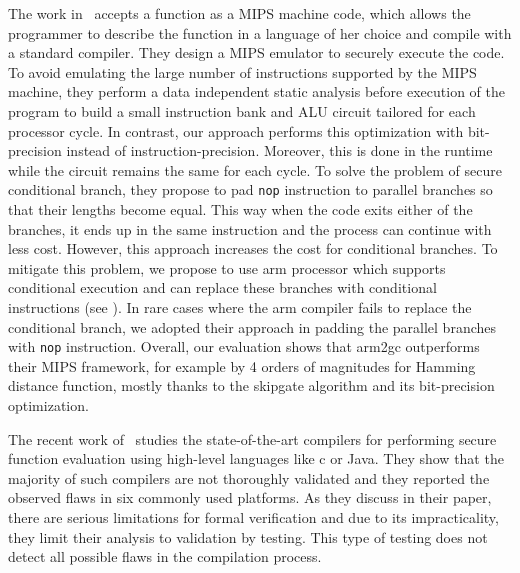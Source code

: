 The work in~\cite{wang2016secure} accepts a function as a MIPS machine code, which allows the programmer to describe the function in a language of her choice and compile with a standard compiler.
They design a MIPS emulator to securely execute the code.
To avoid emulating the large number of instructions supported by the MIPS machine, they perform a data independent static analysis before execution of the program to build a small instruction bank and ALU circuit tailored for each processor cycle.
In contrast, our approach performs this optimization with bit-precision instead of instruction-precision.
Moreover, this is done in the runtime while the circuit remains the same for each cycle.
To solve the problem of secure conditional branch, they propose to pad \texttt{nop} instruction to parallel branches so that their lengths become equal.
This way when the code exits either of the branches, it ends up in the same instruction and the process can continue with less cost.
However, this approach increases the cost for conditional branches.
To mitigate this problem, we propose to use \gls{arm} processor which supports conditional execution and can replace these branches with conditional instructions (see ).
In rare cases where the \gls{arm} compiler fails to replace the conditional branch, we adopted their approach in padding the parallel branches with \texttt{nop} instruction.
Overall, our evaluation shows that \gls{arm2gc} outperforms their MIPS framework, for example by 4 orders of magnitudes for Hamming distance function, mostly thanks to the \gls{skipgate} algorithm and its bit-precision optimization.

The recent work of~\cite{mood2016frigate} studies the state-of-the-art compilers for performing secure function evaluation using high-level languages like \gls{c} or Java.
They show that the majority of such compilers are not thoroughly validated and they reported the observed flaws in six commonly used platforms.
As they discuss in their paper, there are serious limitations for formal verification and due to its impracticality, they limit their analysis to validation by testing.
This type of testing does not detect all possible flaws in the compilation process.


